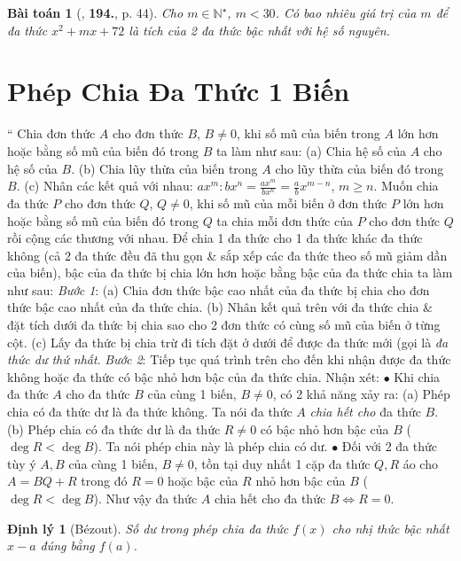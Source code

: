 \documentclass{article}
\numberwithin{equation}{section}
\newtheorem{baitoan}{Bài toán}
\newtheorem{dinhly}{Định lý}[section]
\begin{document}
\begin{baitoan}[\cite{Tuyen_Toan_7}, \textbf{194.}, p. 44]
	Cho $m\in\mathbb{N}^\star$, $m < 30$. Có bao nhiêu giá trị của $m$ để đa thức $x^2 + mx + 72$ là tích của 2 đa thức bậc nhất với hệ số nguyên.
\end{baitoan}


\section{Phép Chia Đa Thức 1 Biến}
`` Chia đơn thức $A$ cho đơn thức $B$, $B\ne0$, khi số mũ của biến trong $A$ lớn hơn hoặc bằng số mũ của biến đó trong $B$ ta làm như sau: (a) Chia hệ số của $A$ cho hệ số của $B$. (b) Chia lũy thừa của biến trong $A$ cho lũy thừa của biến đó trong $B$. (c) Nhân các kết quả với nhau: $ax^m:bx^n = \frac{ax^m}{bx^n} = \frac{a}{b}x^{m-n}$, $m\ge n$.  Muốn chia đa thức $P$ cho đơn thức $Q$, $Q\ne0$, khi số mũ của mỗi biến ở đơn thức $P$ lớn hơn hoặc bằng số mũ của biến đó trong $Q$ ta chia mỗi đơn thức của $P$ cho đơn thức $Q$ rồi cộng các thương với nhau.  Để chia 1 đa thức cho 1 đa thức khác đa thức không (cả 2 đa thức đều đã thu gọn \& sắp xếp các đa thức theo số mũ giảm dần của biến), bậc của đa thức bị chia lớn hơn hoặc bằng bậc của đa thức chia ta làm như sau: \textit{Bước 1}: (a) Chia đơn thức bậc cao nhất của đa thức bị chia cho đơn thức bậc cao nhất của đa thức chia. (b) Nhân kết quả trên với đa thức chia \& đặt tích dưới đa thức bị chia sao cho 2 đơn thức có cùng số mũ của biến ở từng cột. (c) Lấy đa thức bị chia trừ đi tích đặt ở dưới để được đa thức mới (gọi là \textit{đa thức dư thứ nhất}. \textit{Bước 2}: Tiếp tục quá trình trên cho đến khi nhận được đa thức không hoặc đa thức có bậc nhỏ hơn bậc của đa thức chia.  Nhận xét: $\bullet$ Khi chia đa thức $A$ cho đa thức $B$ của cùng 1 biến, $B\ne0$, có 2 khả năng xảy ra: (a) Phép chia có đa thức dư là đa thức không. Ta nói đa thức $A$ \textit{chia hết cho} đa thức $B$. (b) Phép chia có đa thức dư là đa thức $R\ne0$ có bậc nhỏ hơn bậc của $B$ ($\deg R < \deg B$). Ta nói phép chia này là phép chia có dư. $\bullet$ Đối với 2 đa thức tùy ý $A,B$ của cùng 1 biến, $B\ne0$, tồn tại duy nhất 1 cặp đa thức $Q,R$ áo cho $A = BQ + R$ trong đó $R = 0$ hoặc bậc của $R$ nhỏ hơn bậc của $B$ ($\deg R < \deg B$). Như vậy đa thức $A$ chia hết cho đa thức $B\Leftrightarrow R = 0$.

\begin{dinhly}[B\'ezout]
	Số dư trong phép chia đa thức $f(x)$ cho nhị thức bậc nhất $x - a$ đúng bằng $f(a)$.
\end{dinhly}
\end{document}
